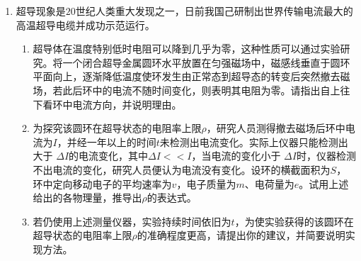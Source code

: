 \begin{enumerate}
{\begin{enumerate}
\end{enumerate}


}


\item 
{}
超导现象是$ 20 $世纪人类重大发现之一，日前我国己研制出世界传输电流最大的高温超导电缆并成功示范运行。

\begin{enumerate}
\renewcommand{\labelenumi}{\arabic{enumi}.}
\item
超导体在温度特别低时电阻可以降到几乎为零，这种性质可以通过实验研究。将一个闭合超导金属圆环水平放置在匀强磁场中，磁感线垂直于圆环平面向上，逐渐降低温度使环发生由正常态到超导态的转变后突然撤去磁场，若此后环中的电流不随时间变化，则表明其电阻为零。请指出自上往下看环中电流方向，并说明理由。
\item 
为探究该圆环在超导状态的电阻率上限$ \rho $，研究人员测得撤去磁场后环中电流为$ I $，并经一年以上的时间$ t $未检测出电流变化。实际上仪器只能检测出大于 $ \Delta I $的电流变化，其中$ \Delta I << I $，当电流的变化小于 $\Delta I $时，仪器检测不出电流的变化，研究人员便认为电流没有变化。设环的横截面积为$ S $，环中定向移动电子的平均速率为$ v $，电子质量为$ m $、电荷量为$ e $。试用上述给出的各物理量，推导出$ \rho $的表达式。
\item 
若仍使用上述测量仪器，实验持续时间依旧为$ t $，为使实验获得的该圆环在超导状态的电阻率上限$ \rho $的准确程度更高，请提出你的建议，并简要说明实现方法。



\end{enumerate}









\end{enumerate}




